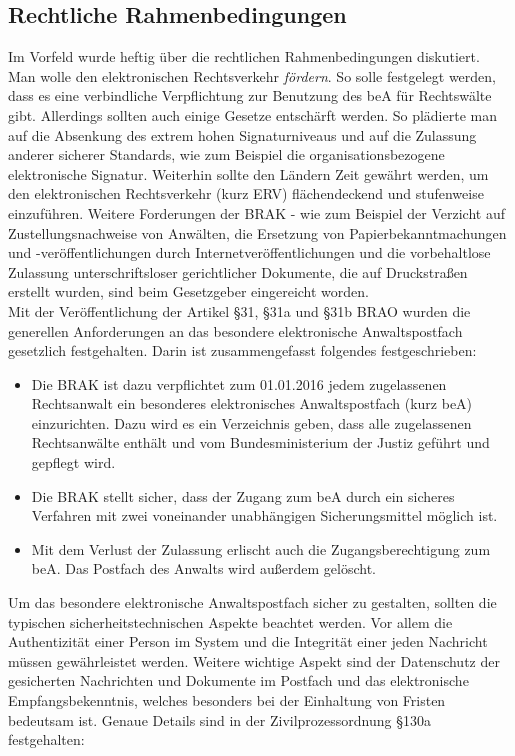 \subsection{Rechtliche Rahmenbedingungen}
Im Vorfeld wurde heftig über die rechtlichen Rahmenbedingungen diskutiert. Man wolle den elektronischen Rechtsverkehr \textit{fördern}. So solle festgelegt werden, dass es eine verbindliche Verpflichtung zur Benutzung des beA für Rechtswälte gibt. Allerdings sollten auch einige Gesetze entschärft werden. So plädierte man auf die Absenkung des extrem hohen Signaturniveaus und auf die Zulassung anderer sicherer Standards, wie zum Beispiel die organisationsbezogene elektronische Signatur. Weiterhin sollte den Ländern Zeit gewährt werden, um den elektronischen Rechtsverkehr (kurz ERV) flächendeckend und stufenweise einzuführen. Weitere Forderungen der BRAK - wie zum Beispiel der Verzicht auf Zustellungsnachweise von Anwälten, die Ersetzung von Papierbekanntmachungen und -veröffentlichungen durch Internetveröffentlichungen und die vorbehaltlose Zulassung unterschriftsloser gerichtlicher Dokumente, die auf Druckstraßen erstellt wurden, sind beim Gesetzgeber eingereicht worden. \\
Mit der Veröffentlichung der Artikel §31, §31a und §31b BRAO \textcite{bea:bea:brao31} wurden die generellen Anforderungen an das besondere elektronische Anwaltspostfach gesetzlich festgehalten. Darin ist zusammengefasst folgendes festgeschrieben:
\begin{itemize}
	\item Die BRAK ist dazu verpflichtet zum 01.01.2016 jedem zugelassenen Rechtsanwalt ein besonderes elektronisches Anwaltspostfach (kurz beA) einzurichten. Dazu wird es ein Verzeichnis geben, dass alle zugelassenen Rechtsanwälte enthält und vom Bundesministerium der Justiz geführt und gepflegt wird.
	\item Die BRAK stellt sicher, dass der Zugang zum beA durch ein sicheres Verfahren mit zwei voneinander unabhängigen Sicherungsmittel möglich ist.
	\item Mit dem Verlust der Zulassung erlischt auch die Zugangsberechtigung zum beA. Das Postfach des Anwalts wird außerdem gelöscht.
\end{itemize}

Um das besondere elektronische Anwaltspostfach sicher zu gestalten, sollten die typischen sicherheitstechnischen Aspekte beachtet werden. Vor allem die Authentizität einer Person im System und die Integrität einer jeden Nachricht müssen gewährleistet werden. Weitere wichtige Aspekt sind der Datenschutz der gesicherten Nachrichten und Dokumente im Postfach und das elektronische Empfangsbekenntnis, welches besonders bei der Einhaltung von Fristen bedeutsam ist. Genaue Details sind in der Zivilprozessordnung §130a \textcite{bea:bea:zpo130} festgehalten:

